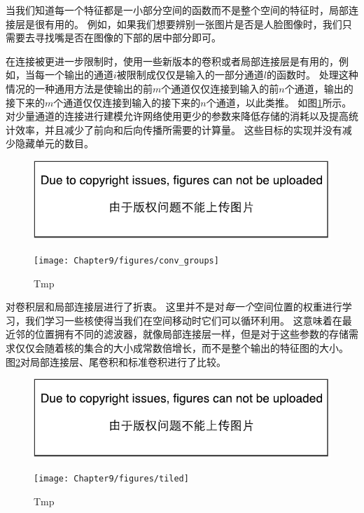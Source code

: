  
当我们知道每一个特征都是一小部分空间的函数而不是整个空间的特征时，局部连接层是很有用的。
例如，如果我们想要辨别一张图片是否是人脸图像时，我们只需要去寻找嘴是否在图像的下部的居中部分即可。

在连接被更进一步限制时，使用一些新版本的卷积或者局部连接层是有用的，例如，当每一个输出的通道$i$被限制成仅仅是输入的一部分通道$l$的函数时。
处理这种情况的一种通用方法是使输出的前$m$个通道仅仅连接到输入的前$n$个通道，输出的接下来的$m$个通道仅仅连接到输入的接下来的$n$个通道，以此类推。
如图\ref{fig:chap9_conv_groups}所示。
对少量通道的连接进行建模允许网络使用更少的参数来降低存储的消耗以及提高统计效率，并且减少了前向和后向传播所需要的计算量。
这些目标的实现并没有减少隐藏单元的数目。
\begin{figure}[!htb]
\ifOpenSource
\centerline{\includegraphics{figure.pdf}}
\else
\centerline{\texttt{[image: Chapter9/figures/conv\_groups]}}
\fi
\caption{Tmp}
\label{fig:chap9_conv_groups}
\end{figure}

\citep{Gregor+LeCun-2010,Le2010}对卷积层和局部连接层进行了折衷。
这里并不是对\emph{每一个}空间位置的权重进行学习，我们学习一些核使得当我们在空间移动时它们可以循环利用。
这意味着在最近邻的位置拥有不同的滤波器，就像局部连接层一样，但是对于这些参数的存储需求仅仅会随着核的集合的大小成常数倍增长，而不是整个输出的特征图的大小。
图\ref{fig:chap9_tiled}对局部连接层、尾卷积和标准卷积进行了比较。
\begin{figure}[!htb]
\ifOpenSource
\centerline{\includegraphics{figure.pdf}}
\else
\centerline{\texttt{[image: Chapter9/figures/tiled]}}
\fi
\caption{Tmp}
\label{fig:chap9_tiled}
\end{figure}
 
